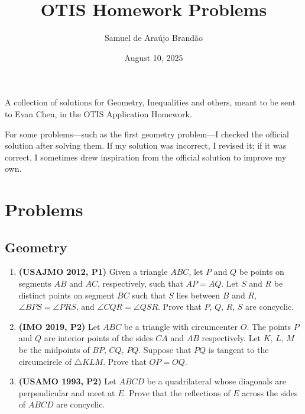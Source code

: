 \documentclass[12pt]{article}
\title{\sffamily\bfseries{OTIS Homework Problems}}
\author{Samuel de Araújo Brandão}
\date{August 10, 2025}
\begin{document}
  \maketitle

  A collection of solutions for Geometry, Inequalities and others, meant to be sent to Evan Chen, in the OTIS Application Homework.

  For some problems—such as the first geometry problem—I checked the official solution after solving them. If my solution was incorrect, I 
  revised it; if it was correct, I sometimes drew inspiration from the official solution to improve my own.

  \tableofcontents
  
  \clearpage
  
  \section{\textsf{Problems}}
    \subsection{Geometry}
      \begin{enumerate}[label=\textbf{A.\arabic*.}]
        \item \textbf{\textcolor{color2}{(USAJMO 2012, P1)}} Given a triangle $ABC$, let $P$ and $Q$ be points on segments $AB$ and $AC$, respectively, such
          that $AP = AQ$. Let $S$ and $R$ be distinct points on segment $BC$ such that $S$ lies between $B$ and $R$, $\angle BPS = \angle PRS$,
          and $\angle CQR = \angle QSR$. Prove that $P$, $Q$, $R$, $S$ are concyclic.

        \item \textbf{\textcolor{color2}{(IMO 2019, P2)}} Let $ABC$ be a triangle with circumcenter $O$. The points $P$ and $Q$ are interior points of the sides $CA$
          and $AB$ respectively. Let $K$, $L$, $M$ be the midpoints of $BP$, $CQ$, $PQ$. Suppose that $PQ$ is tangent to the circumcircle 
          of $\triangle KLM$. Prove that $OP = OQ$.

        \item \textbf{\textcolor{color2}{(USAMO 1993, P2)}} Let $ABCD$ be a quadrilateral whose diagonals are perpendicular and meet at $E$. Prove that the reflections
          of $E$ across the sides of $ABCD$ are concyclic.
      \end{enumerate}
\end{document}
